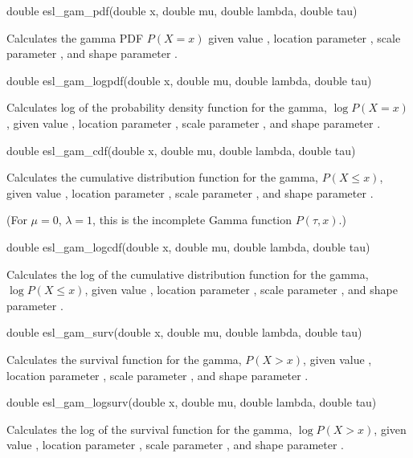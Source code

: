\begin{sreapi}
\hypertarget{func:esl_gam_pdf()}
{\item[double esl\_gam\_pdf(double x, double mu, double lambda, double tau)]}

Calculates the gamma PDF $P(X=x)$ given value ,
location parameter , scale parameter , and shape
parameter .


\hypertarget{func:esl_gam_logpdf()}
{\item[double esl\_gam\_logpdf(double x, double mu, double lambda, double tau)]}

Calculates log of the probability density function
for the gamma, $\log P(X=x)$, given value ,
location parameter , scale parameter , and 
shape parameter .


\hypertarget{func:esl_gam_cdf()}
{\item[double esl\_gam\_cdf(double x, double mu, double lambda, double tau)]}

Calculates the cumulative distribution function
for the gamma, $P(X \leq x)$, given value , 
location parameter , scale parameter , and 
shape parameter .

(For $\mu=0$, $\lambda = 1$, this is the
incomplete Gamma function $P(\tau,x)$.)


\hypertarget{func:esl_gam_logcdf()}
{\item[double esl\_gam\_logcdf(double x, double mu, double lambda, double tau)]}

Calculates the log of the cumulative distribution function 
for the gamma, $\log P(X \leq x)$, given value , location
parameter , scale parameter , and shape 
parameter .


\hypertarget{func:esl_gam_surv()}
{\item[double esl\_gam\_surv(double x, double mu, double lambda, double tau)]}

Calculates the survival function for the gamma, $P(X > x)$,
given value , location parameter , scale parameter 
, and shape parameter .


\hypertarget{func:esl_gam_logsurv()}
{\item[double esl\_gam\_logsurv(double x, double mu, double lambda, double tau)]}

Calculates the log of the survival function for the gamma, 
$\log P(X > x)$, given value , location parameter ,
scale parameter , and shape parameter .


\end{sreapi}
